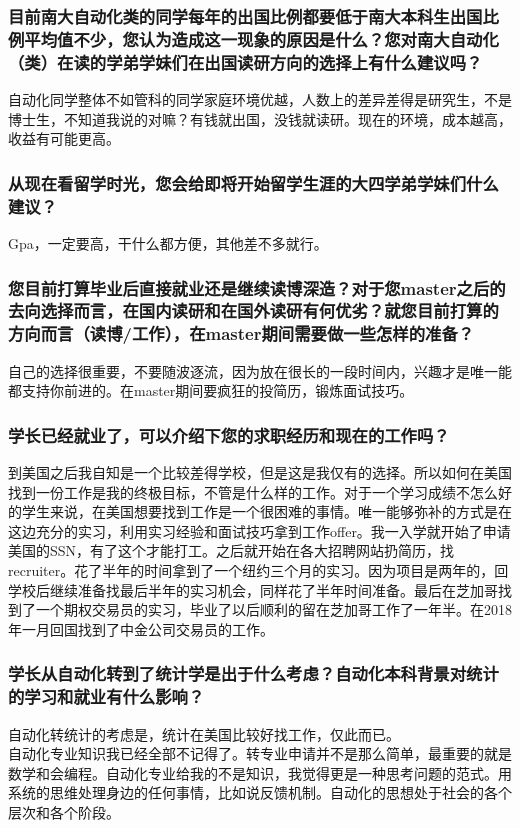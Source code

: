 \documentclass[a4paper,UTF8]{book}
\begin{document}
    \subsubsection*{目前南大自动化类的同学每年的出国比例都要低于南大本科生出国比例平均值不少，您认为造成这一现象的原因是什么？您对南大自动化（类）在读的学弟学妹们在出国读研方向的选择上有什么建议吗？}
    自动化同学整体不如管科的同学家庭环境优越，人数上的差异差得是研究生，不是博士生，不知道我说的对嘛？有钱就出国，没钱就读研。现在的环境，成本越高，收益有可能更高。

    \subsubsection*{从现在看留学时光，您会给即将开始留学生涯的大四学弟学妹们什么建议？}
    Gpa，一定要高，干什么都方便，其他差不多就行。

    \subsubsection*{您目前打算毕业后直接就业还是继续读博深造？对于您master之后的去向选择而言，在国内读研和在国外读研有何优劣？就您目前打算的方向而言（读博/工作），在master期间需要做一些怎样的准备？}
    自己的选择很重要，不要随波逐流，因为放在很长的一段时间内，兴趣才是唯一能都支持你前进的。在master期间要疯狂的投简历，锻炼面试技巧。

    \subsubsection*{学长已经就业了，可以介绍下您的求职经历和现在的工作吗？}
    到美国之后我自知是一个比较差得学校，但是这是我仅有的选择。所以如何在美国找到一份工作是我的终极目标，不管是什么样的工作。对于一个学习成绩不怎么好的学生来说，在美国想要找到工作是一个很困难的事情。唯一能够弥补的方式是在这边充分的实习，利用实习经验和面试技巧拿到工作offer。我一入学就开始了申请美国的SSN，有了这个才能打工。之后就开始在各大招聘网站扔简历，找recruiter。花了半年的时间拿到了一个纽约三个月的实习。因为项目是两年的，回学校后继续准备找最后半年的实习机会，同样花了半年时间准备。最后在芝加哥找到了一个期权交易员的实习，毕业了以后顺利的留在芝加哥工作了一年半。在2018年一月回国找到了中金公司交易员的工作。

    \subsubsection*{学长从自动化转到了统计学是出于什么考虑？自动化本科背景对统计的学习和就业有什么影响？}
    自动化转统计的考虑是，统计在美国比较好找工作，仅此而已。\\
    自动化专业知识我已经全部不记得了。转专业申请并不是那么简单，最重要的就是数学和会编程。自动化专业给我的不是知识，我觉得更是一种思考问题的范式。用系统的思维处理身边的任何事情，比如说反馈机制。自动化的思想处于社会的各个层次和各个阶段。
    
\end{document}
